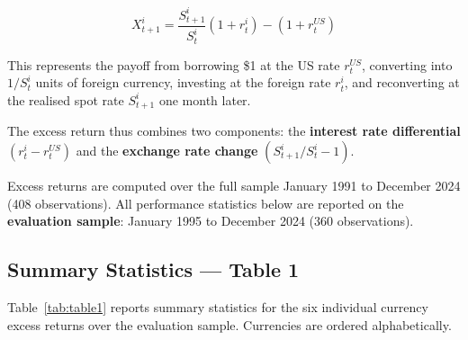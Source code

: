 \documentclass[a4paper,12pt]{article}
\begin{document}
\begin{equation}
    X^i_{t+1} = \frac{S^i_{t+1}}{S^i_t}\left(1 + r^i_t\right) - \left(1 + r^{US}_t\right)
    \label{eq:excess}
\end{equation}

This represents the payoff from borrowing \$1 at the US rate $r^{US}_t$, converting into
$1/S^i_t$ units of foreign currency, investing at the foreign rate $r^i_t$, and
reconverting at the realised spot rate $S^i_{t+1}$ one month later.

The excess return thus combines two components:
the \textbf{interest rate differential} $(r^i_t - r^{US}_t)$
and the \textbf{exchange rate change} $(S^i_{t+1}/S^i_t - 1)$.

Excess returns are computed over the full sample January 1991 to December 2024
(408 observations). All performance statistics below are reported on the
\textbf{evaluation sample}: January 1995 to December 2024 (360 observations).

\subsection{Summary Statistics --- Table 1}

Table~\ref{tab:table1} reports summary statistics for the six individual currency excess
returns over the evaluation sample. Currencies are ordered alphabetically.
\end{document}
